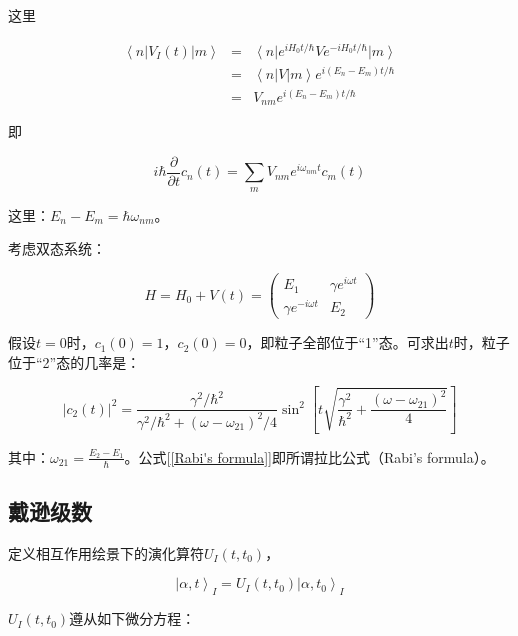 这里

\begin{eqnarray*}
\left\langle n \right| V_I(t) \left| m \right\rangle & = & \left\langle n \right| e^{iH_0t / \hbar} V e^{-iH_0t / \hbar} \left| m \right\rangle  \\
 {} & = & \left\langle n \right| V \left| m \right\rangle e^{i(E_n - E_m)t / \hbar} \\
{} & = & V_{nm} e^{i(E_n - E_m)t / \hbar}
\end{eqnarray*}

即

\begin{equation}
i \hbar \frac{\partial }{\partial t} c_n(t) = \sum\limits_m V_{nm} e^{i \omega_{nm} t} c_m(t)
\end{equation}

这里：$E_n - E_m = \hbar \omega_{nm}$。

考虑双态系统：

\begin{equation}
H = H_0 + V(t) = \left( \begin{array}{cc} E_1 & \gamma e^{i \omega t} \\  \gamma e^{- i \omega t} & E_2  \end{array} \right)
\end{equation}

假设$t=0$时，$c_1 (0) = 1$，$c_2 (0) = 0$，即粒子全部位于“1”态。可求出$t$时，粒子位于“2”态的几率是：

\begin{equation}
|c_2(t)|^2 = \frac{\gamma^2 / \hbar^2}{\gamma^2 / \hbar^2 + (\omega - \omega_{21})^2 / 4} \sin^2 \left[ t \sqrt{ \frac{\gamma^2}{\hbar^2} + \frac{(\omega - \omega_{21})^2}{4} }    \right]
\label{Rabi's formula}
\end{equation}

其中：$\omega_{21} = \frac{E_2 - E_1}{\hbar}$。公式[\ref{Rabi's formula}]即所谓拉比公式（Rabi's formula）。

\subsection{戴逊级数}

定义相互作用绘景下的演化算符$U_I(t, t_0)$，

\begin{equation}
\left| \alpha,t  \right\rangle_I = U_I(t, t_0) \left| \alpha,t_0 \right\rangle_I
\end{equation}

$U_I(t, t_0)$遵从如下微分方程：

